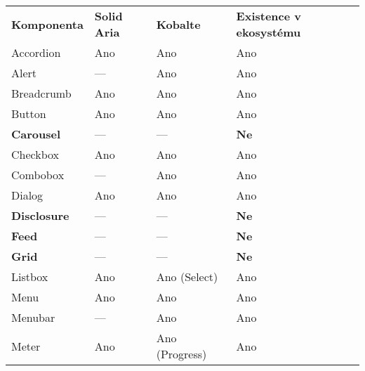 \begin{table}[ht]
    \begin{tabularx}{\textwidth}{Y Y Y Y}
        \bfseries{Komponenta}   & \bfseries{Solid Aria} & \bfseries{Kobalte} & \bfseries{Existence v ekosystému} \\\Midrule{}
        Accordion               & Ano                   & Ano                & Ano                               \\
        Alert                   & ---                   & Ano                & Ano                               \\
        Breadcrumb              & Ano                   & Ano                & Ano                               \\
        Button                  & Ano                   & Ano                & Ano                               \\
        \textbf{Carousel}       & ---                   & ---                & \textbf{Ne}                       \\
        Checkbox                & Ano                   & Ano                & Ano                               \\
        Combobox                & ---                   & Ano                & Ano                               \\
        Dialog                  & Ano                   & Ano                & Ano                               \\
        \textbf{Disclosure}     & ---                   & ---                & \textbf{Ne}                       \\
        \textbf{Feed}           & ---                   & ---                & \textbf{Ne}                       \\
        \textbf{Grid}           & ---                   & ---                & \textbf{Ne}                       \\
        Listbox                 & Ano                   & Ano (Select)       & Ano                               \\
        Menu                    & Ano                   & Ano                & Ano                               \\
        Menubar                 & ---                   & Ano                & Ano                               \\
        Meter                   & Ano                   & Ano (Progress)     & Ano                               \\

\end{tabularx}
\end{table}
